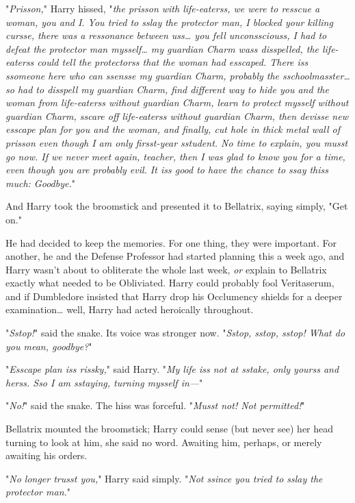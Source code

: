 "\emph{Prisson,}" Harry hissed, "\emph{the prisson with life-eaterss, we were 
to resscue a woman, you and I. You tried to sslay the protector man, I blocked 
your killing cursse, there was a ressonance between uss{\ldots} you fell 
unconssciouss, I had to defeat the protector man mysself{\ldots} my guardian 
Charm wass disspelled, the life-eaterss could tell the protectorss that the 
woman had esscaped. There iss ssomeone here who can ssensse my guardian Charm, 
probably the sschoolmasster{\ldots} so had to disspell my guardian Charm, find 
different way to hide you and the woman from life-eaterss without guardian 
Charm, learn to protect mysself without guardian Charm, sscare off life-eaterss 
without guardian Charm, then devisse new esscape plan for you and the woman, 
and finally, cut hole in thick metal wall of prisson even though I am only 
firsst-year sstudent. No time to explain, you musst go now. If we never meet 
again, teacher, then I was glad to know you for a time, even though you are 
probably evil. It iss good to have the chance to ssay thiss much: Goodbye.}"

And Harry took the broomstick and presented it to Bellatrix, saying simply, 
"Get on."

He had decided to keep the memories. For one thing, they were important. For 
another, he and the Defense Professor had started planning this a week ago, and 
Harry wasn't about to obliterate the whole last week, \emph{or} explain to 
Bellatrix exactly what needed to be Obliviated. Harry could probably fool 
Veritaserum, and if Dumbledore insisted that Harry drop his Occlumency shields 
for a deeper examination{\ldots} well, Harry had acted heroically throughout.

"\emph{Sstop!}" said the snake. Its voice was stronger now. "\emph{Sstop, 
sstop, sstop! What do you mean, goodbye?}"

"\emph{Esscape plan iss rissky,}" said Harry. "\emph{My life iss not at sstake, 
only yourss and herss. Sso I am sstaying, turning mysself in---}"

"\emph{No!}" said the snake. The hiss was forceful. "\emph{Musst not! Not 
permitted!}"

Bellatrix mounted the broomstick; Harry could sense (but never see) her head 
turning to look at him, she said no word. Awaiting him, perhaps, or merely 
awaiting his orders.

"\emph{No longer trusst you,}" Harry said simply. "\emph{Not ssince you tried 
to sslay the protector man.}"

